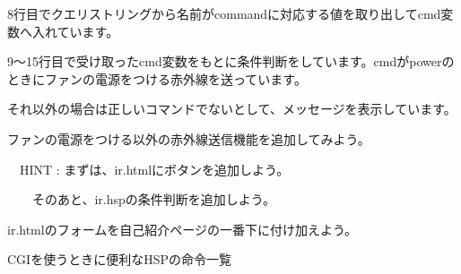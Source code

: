 8行目でクエリストリングから名前がcommandに対応する値を取り出してcmd変数へ入れています。

9〜15行目で受け取ったcmd変数をもとに条件判断をしています。cmdがpowerのときにファンの電源をつける赤外線を送っています。

それ以外の場合は正しいコマンドでないとして、メッセージを表示しています。

\theQuestion\label{Q:IR}
ファンの電源をつける以外の赤外線送信機能を追加してみよう。

\ \ HINT : まずは、ir.htmlにボタンを追加しよう。

\ \ \ \ そのあと、ir.hspの条件判断を追加しよう。

ir.htmlのフォームを自己紹介ページの一番下に付け加えよう。

\clearpage
\noindent CGIを使うときに便利なHSPの命令一覧

